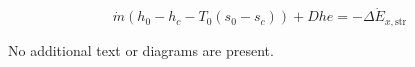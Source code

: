 \[
\dot{m} \left( h_0 - h_c - T_0 \left( s_0 - s_c \right) \right) + Dhe = -\Delta \dot{E}_{x,\text{str}}
\]  

No additional text or diagrams are present.